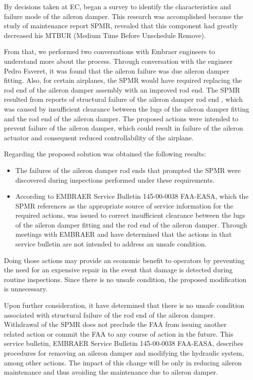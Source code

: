By decisions taken at EC, began a survey to identify the characteristics and failure mode of the aileron damper. This research was accomplished because the study of maintenance report SPMR, revealed that this component had greatly decreased his MTBUR (Medium Time Before Unschedule Remove).

From that, we performed two conversations with Embraer engineers to understand more about the process. Through conversation with the engineer Pedro Faveret, it was found that the aileron failure was due aileron damper fitting. Also, for certain airplanes, the SPMR would have required replacing the rod end of the aileron damper assembly with an improved rod end. The SPMR resulted from reports of structural failure of the aileron damper rod end , which was caused by insufficient clearance between the lugs of the aileron damper fitting and the rod end of the aileron damper. The proposed actions were intended to prevent failure of the aileron damper, which could result in failure of the aileron actuator and consequent reduced controllability of the airplane.

Regarding the proposed solution was obtained the following results:

\begin{itemize}
\item The failures of the aileron damper rod ends that prompted the SPMR were discovered during inspections performed under these requirements.
\item According to EMBRAER Service Bulletin 145-00-0038 FAA-EASA, which the SPMR references as the appropriate source of service information for the required actions, was issued to correct insufficient clearance between the lugs of the aileron damper fitting and the rod end of the aileron damper. Through meetings with EMBRAER and have determined that the actions in that service bulletin are not intended to address an unsafe condition.
\end{itemize}

Doing those actions may provide an economic benefit to operators by preventing the need for an expensive repair in the event that damage is detected during routine inspections. Since there is no unsafe condition, the proposed modification is unnecessary.

Upon further consideration, it have determined that there is no unsafe condition associated with structural failure of the rod end of the aileron damper.
Withdrawal of the SPMR does not preclude the FAA from issuing another related action or commit the FAA to any course of action in the future.
This service bulletin, EMBRAER Service Bulletin 145-00-0038 FAA-EASA, describes procedures for removing an aileron damper and modifying the hydraulic system, among other actions.
The impact of this change will be only in reducing aileron maintenance and thus avoiding the maintenance due to aileron damper.
